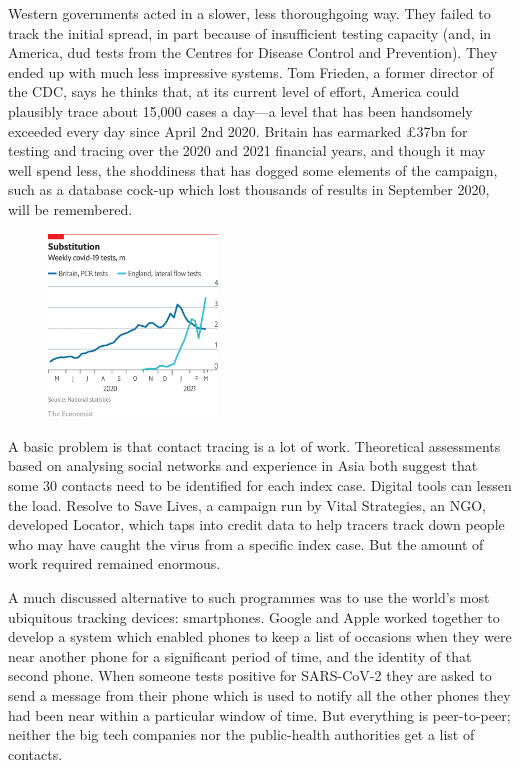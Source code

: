 \documentclass{article}
\begin{document}
Western governments acted in a slower, less thoroughgoing way. They failed to track the initial spread, in part because of insufficient testing capacity (and, in America, dud tests from the Centres for Disease Control and Prevention). They ended up with much less impressive systems. Tom Frieden, a former director of the CDC, says he thinks that, at its current level of effort, America could plausibly trace about 15,000 cases a day---a level that has been handsomely exceeded every day since April 2nd 2020. Britain has earmarked £37bn for testing and tracing over the 2020 and 2021 financial years, and though it may well spend less, the shoddiness that has dogged some elements of the campaign, such as a database cock-up which lost thousands of results in September 2020, will be remembered. 

\begin{figure}[h]
\centering
\includegraphics[width=0.4\textwidth]{images/20210327_tqc144.png}
\end{figure}


A basic problem is that contact tracing is a lot of work. Theoretical assessments based on analysing social networks and experience in Asia both suggest that some 30 contacts need to be identified for each index case. Digital tools can lessen the load. Resolve to Save Lives, a campaign run by Vital Strategies, an NGO, developed Locator, which taps into credit data to help tracers track down people who may have caught the virus from a specific index case. But the amount of work required remained enormous. 

A much discussed alternative to such programmes was to use the world's most ubiquitous tracking devices: smartphones. Google and Apple worked together to develop a system which enabled phones to keep a list of occasions when they were near another phone for a significant period of time, and the identity of that second phone. When someone tests positive for SARS-CoV-2 they are asked to send a message from their phone which is used to notify all the other phones they had been near within a particular window of time. But everything is peer-to-peer; neither the big tech companies nor the public-health authorities get a list of contacts. 
\end{document}
